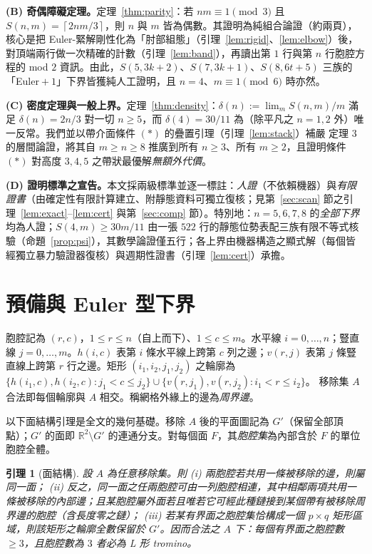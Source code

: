 \documentclass[11pt]{ctexart}
\newtheorem{lemma}[theorem]{引理}
\theoremstyle{definition}
\newcommand{\ceil}[1]{\left\lceil #1 \right\rceil}
\begin{document}
\smallskip
\noindent\textbf{(B) 奇偶障礙定理。}定理~\ref{thm:parity}：若 $nm\equiv 1\pmod 3$ 且 $S(n,m)=\ceil{2nm/3}$，則 $n$ 與 $m$ 皆為偶數。其證明為純組合論證（約兩頁），核心是把 Euler-緊解剛性化為「肘部組態」（引理~\ref{lem:rigid}、\ref{lem:elbow}）後，對頂端兩行做一次精確的計數（引理~\ref{lem:band}），再讀出第 $1$ 行與第 $n$ 行胞腔方程的 mod $2$ 資訊。由此，$S(5,3k{+}2)$、$S(7,3k{+}1)$、$S(8,6t{+}5)$ 三族的「Euler${}+1$」下界皆獲純人工證明，且 $n=4$、$m\equiv 1\pmod 6$ 時亦然。

\smallskip
\noindent\textbf{(C) 密度定理與一般上界。}定理~\ref{thm:density}：$\delta(n):=\lim_m S(n,m)/m$ 滿足 $\delta(n)=2n/3$ 對一切 $n\ge 5$，而 $\delta(4)=30/11$ 為（除平凡之 $n=1,2$ 外）唯一反常。我們並以帶介面條件 $(*)$ 的疊置引理（引理~\ref{lem:stack}）補嚴 \cite{NT25} 定理 3 的層間論證，將其自 $m\ge n\ge 8$ 推廣到所有 $n\ge 3$、所有 $m\ge 2$，且證明條件 $(*)$ 對高度 $3,4,5$ 之帶狀最優解\emph{無額外代價}。

\smallskip
\noindent\textbf{(D) 證明標準之宣告。}本文採兩級標準並逐一標註：\emph{人證}（不依賴機器）與\emph{有限證書}（由確定性有限計算建立、附靜態資料可獨立復核；見第~\ref{sec:scan} 節之引理~\ref{lem:exact}--\ref{lem:cert} 與第~\ref{sec:comp} 節）。特別地：$n=5,6,7,8$ 的\emph{全部下界}均為人證；$S(4,m)\ge 30m/11$ 由一張 $522$ 行的靜態位勢表配三族有限不等式核驗（命題~\ref{prop:psi}），其數學論證僅五行；各上界由機器構造之顯式解（每個皆經獨立暴力驗證器復核）與週期性證書（引理~\ref{lem:cert}）承擔。

\section{預備與 Euler 型下界}\label{sec:prelim}

胞腔記為 $(r,c)$，$1\le r\le n$（自上而下）、$1\le c\le m$。水平線 $i=0,\dots,n$；豎直線 $j=0,\dots,m$。$h(i,c)$ 表第 $i$ 條水平線上跨第 $c$ 列之邊；$v(r,j)$ 表第 $j$ 條豎直線上跨第 $r$ 行之邊。矩形 $(i_1,i_2,j_1,j_2)$ 之輪廓為
$\{h(i_1,c),h(i_2,c): j_1<c\le j_2\}\cup\{v(r,j_1),v(r,j_2): i_1<r\le i_2\}$。
移除集 $A$ 合法即每個輪廓與 $A$ 相交。稱網格外緣上的邊為\emph{周界邊}。

以下面結構引理是全文的幾何基礎。移除 $A$ 後的平面圖記為 $G'$（保留全部頂點）；$G'$ 的面即 $\mathbb R^2\setminus G'$ 的連通分支。對每個面 $F$，其\emph{胞腔集}為內部含於 $F$ 的單位胞腔全體。

\begin{lemma}[面結構]\label{lem:face}
設 $A$ 為任意移除集。則
\emph{(i)} 兩胞腔若共用一條被移除的邊，則屬同一面；
\emph{(ii)} 反之，同一面之任兩胞腔可由一列胞腔相連，其中相鄰兩項共用一條被移除的\emph{內部}邊；且某胞腔屬外面若且唯若它可經此種鏈接到某個帶有被移除\emph{周界}邊的胞腔（含長度零之鏈）；
\emph{(iii)} 若某有界面之胞腔集恰構成一個 $p\times q$ 矩形區域，則該矩形之輪廓全數保留於 $G'$。因而合法之 $A$ 下：每個有界面之胞腔數 $\ge 3$，且胞腔數為 $3$ 者必為 L 形 tromino。
\end{lemma}
\end{document}
